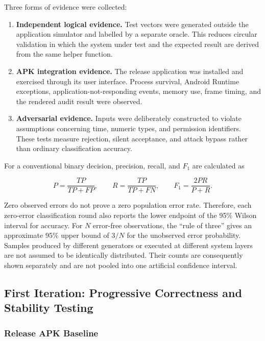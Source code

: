 Three forms of evidence were collected:

\begin{enumerate}
    \item \textbf{Independent logical evidence.} Test vectors were generated outside the application simulator and labelled by a separate oracle. This reduces circular validation in which the system under test and the expected result are derived from the same helper function.
    \item \textbf{APK integration evidence.} The release application was installed and exercised through its user interface. Process survival, Android Runtime exceptions, application-not-responding events, memory use, frame timing, and the rendered audit result were observed.
    \item \textbf{Adversarial evidence.} Inputs were deliberately constructed to violate assumptions concerning time, numeric types, and permission identifiers. These tests measure rejection, silent acceptance, and attack bypass rather than ordinary classification accuracy.
\end{enumerate}

For a conventional binary decision, precision, recall, and \(F_1\) are calculated as

\begin{equation}
P=\frac{TP}{TP+FP}, \qquad
R=\frac{TP}{TP+FN}, \qquad
F_1=\frac{2PR}{P+R}.
\end{equation}

Zero observed errors do not prove a zero population error rate. Therefore, each zero-error classification round also reports the lower endpoint of the 95\% Wilson interval for accuracy. For \(N\) error-free observations, the ``rule of three'' gives an approximate 95\% upper bound of \(3/N\) for the unobserved error probability. Samples produced by different generators or executed at different system layers are not assumed to be identically distributed. Their counts are consequently shown separately and are not pooled into one artificial confidence interval.

\subsection{First Iteration: Progressive Correctness and Stability Testing}

\subsubsection{Release APK Baseline}

